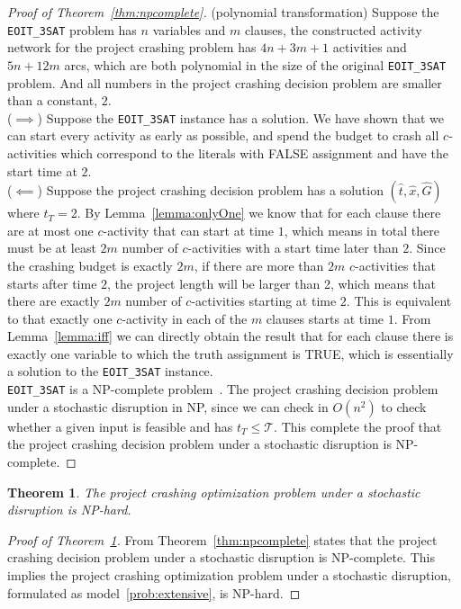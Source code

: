 \documentclass[11pt]{article}
\newtheorem{theorem}{Theorem}
\begin{document}
	\begin{proof}[Proof of Theorem~\ref{thm:npcomplete}]
		(polynomial transformation) 
		Suppose the \verb|EOIT_3SAT| problem has \(n\) variables and \(m\) clauses, the constructed activity network for the project crashing problem has \(4n + 3m + 1\) activities and \(5n + 12m\) arcs, which are both polynomial in the size of the original \verb|EOIT_3SAT| problem. And all numbers in the project crashing decision problem are smaller than a constant, \(2\).\\
		(\(\implies\)) Suppose the \verb|EOIT_3SAT| instance has a solution. We have shown that we can start every activity as early as possible, and spend the budget to crash all \(c\)-activities which correspond to the literals with FALSE assignment and have the start time at \(2\). \\
		(\(\impliedby\)) Suppose the project crashing decision problem has a solution \((\hat{t},\hat{x},\hat{G})\) where \(t_T = 2\). By Lemma~\ref{lemma:onlyOne} we know that for each clause there are at most one \(c\)-activity that can start at time \(1\), which means in total there must be at least \(2m\) number of \(c\)-activities with a start time later than \(2\). Since the crashing budget is exactly \(2m\), if there are more than \(2m\) \(c\)-activities that starts after time \(2\), the project length will be larger than 2, which means that there are exactly \(2m\) number of \(c\)-activities starting at time \(2\). This is equivalent to that exactly one \(c\)-activity in each of the \(m\) clauses starts at time \(1\). From Lemma~\ref{lemma:iff} we can directly obtain the result that for each clause there is exactly one variable to which the truth assignment is TRUE, which is essentially a solution to the \verb|EOIT_3SAT| instance.\\
		\newline
		\verb|EOIT_3SAT| is a NP-complete problem~\cite{Garey1979ComputersAI}. The project crashing decision problem under a stochastic disruption in NP, since we can check in \(O(n^2)\) to check whether a given input is feasible and has \(t_T \leq \mathcal{T}\). This complete the proof that the project crashing decision problem under a stochastic disruption is NP-complete.
	\end{proof}
	\begin{theorem} \label{thm:nphard}
		The project crashing optimization problem under a stochastic disruption is NP-hard.
	\end{theorem}
	\begin{proof}[Proof of Theorem~\ref{thm:nphard}]
		From Theorem~\ref{thm:npcomplete} states that the project crashing decision problem under a stochastic disruption is NP-complete. This implies the project crashing optimization problem under a stochastic disruption, formulated as model~\ref{prob:extensive}, is NP-hard.
	\end{proof}
	
\end{document}
